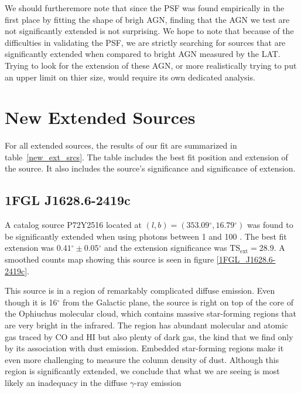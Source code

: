 \documentclass[preprint]{aastex}
\newcommand{\gev}{\text{GeV}\xspace}
\newcommand{\tsext}{{\ensuremath{\text{TS}_\text{ext}}}\xspace}
\renewcommand{\deg}{\ensuremath{^\circ}\xspace}
\begin{document}
We should furtheremore note that since the PSF was found empirically in
the first place by fitting the shape of brigh AGN, finding that the AGN we
test are not significantly extended is not surprising.  We hope to note
that because of the difficulties in validating the PSF, we are strictly
searching for sources that are significantly extended when compared to
bright AGN measured by the LAT. Trying to look for the extension of these
AGN, or more realistically trying to put an upper limit on thier size,
would require its own dedicated analysis.



\section{New Extended Sources}

For all extended sources, the results of our fit are summarized in
table~\ref{new_ext_srcs}. The table includes the best fit position
and extension of the source. It also includes the source's significance
and significance of extension.


\subsection{1FGL J1628.6-2419c}

A catalog source P72Y2516 located at $(l,b)=(353.09\deg, 16.79\deg)$
was found to be significantly extended when using photons between
1 \gev and 100 \gev.  The best fit extension was
$0.41\deg\pm0.05\deg$ and the extension significance was $\tsext=28.9$.
A smoothed counts map showing this source is seen in figure
\ref{1FGL_J1628.6-2419c}.  

This source is in a region of remarkably complicated diffuse emission.
Even though it is 16\deg from the Galactic plane,
the source is right on top of the core of the Ophiuchus molecular cloud,
which contains massive star-forming regions that are very bright
in the infrared.  The region has abundant molecular and atomic gas
traced by CO and HI but also plenty of dark gas, the kind that
we find only by its association with dust emission.
Embedded star-forming regions make it even more challenging to measure
the column density of dust.
Although this region is significantly extended, we conclude that what we
are seeing is most likely an inadequacy in the diffuse $\gamma$-ray emission
\end{document}
